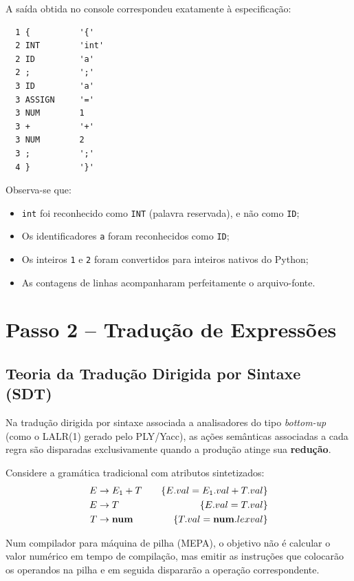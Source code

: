 \documentclass[12pt,a4paper]{article}
\begin{document}
\noindent A saída obtida no console correspondeu exatamente à especificação:
\begin{lstlisting}
  1 {          '{'
  2 INT        'int'
  2 ID         'a'
  2 ;          ';'
  3 ID         'a'
  3 ASSIGN     '='
  3 NUM        1
  3 +          '+'
  3 NUM        2
  3 ;          ';'
  4 }          '}'
\end{lstlisting}

Observa-se que:
\begin{itemize}
    \item \texttt{int} foi reconhecido como \texttt{INT} (palavra reservada), e não como \texttt{ID};
    \item Os identificadores \texttt{a} foram reconhecidos como \texttt{ID};
    \item Os inteiros \texttt{1} e \texttt{2} foram convertidos para inteiros nativos do Python;
    \item As contagens de linhas acompanharam perfeitamente o arquivo-fonte.
\end{itemize}

\section{Passo 2 -- Tradução de Expressões}

\subsection{Teoria da Tradução Dirigida por Sintaxe (SDT)}

Na tradução dirigida por sintaxe associada a analisadores do tipo \textit{bottom-up}
(como o LALR(1) gerado pelo PLY/Yacc), as ações semânticas associadas a cada regra
são disparadas exclusivamente quando a produção atinge sua \textbf{redução}.

Considere a gramática tradicional com atributos sintetizados:
\begin{align*}
    E &\rightarrow E_1 + T \quad & \{ E.val = E_1.val + T.val \} \\
    E &\rightarrow T           & \{ E.val = T.val \} \\
    T &\rightarrow \text{\textbf{num}} & \{ T.val = \text{\textbf{num}}.lexval \}
\end{align*}

Num compilador para máquina de pilha (MEPA), o objetivo não é calcular o valor numérico
em tempo de compilação, mas emitir as instruções que colocarão os operandos na pilha
e em seguida dispararão a operação correspondente.
\end{document}
